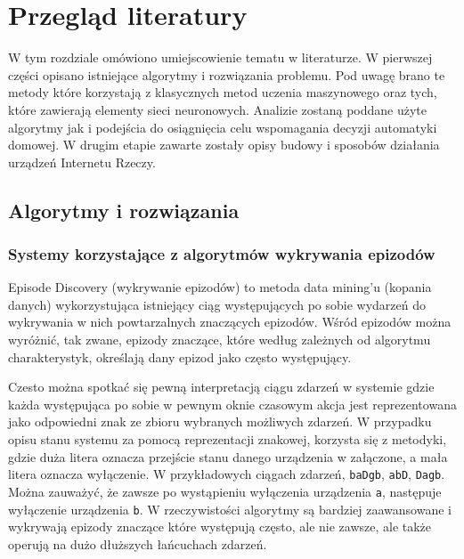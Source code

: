
\chapter{Przegląd literatury}


W tym rozdziale omówiono umiejscowienie tematu w literaturze. W pierwszej części opisano istniejące algorytmy i rozwiązania problemu. Pod uwagę brano te metody które korzystają z klasycznych metod uczenia maszynowego oraz tych, które zawierają elementy sieci neuronowych. Analizie zostaną poddane użyte algorytmy jak i podejścia do osiągnięcia celu wspomagania decyzji automatyki domowej. W drugim etapie zawarte zostały opisy budowy i sposobów działania urządzeń Internetu Rzeczy.

\section{Algorytmy i rozwiązania}
\subsection{Systemy korzystające z algorytmów wykrywania epizodów}
\label{subsec:episode_discovery}
Episode Discovery (wykrywanie epizodów) to metoda data mining'u (kopania danych) wykorzystująca istniejący ciąg występujących po sobie wydarzeń do wykrywania w nich powtarzalnych znaczących epizodów. Wśród epizodów można wyróżnić, tak zwane, epizody znaczące, które według zależnych od algorytmu charakterystyk, określają dany epizod jako często występujący.

Czesto można spotkać się pewną interpretacją ciągu zdarzeń w systemie gdzie każda występująca po sobie w pewnym oknie czasowym akcja jest reprezentowana jako odpowiedni znak ze zbioru wybranych możliwych zdarzeń. W przypadku opisu stanu systemu za pomocą reprezentacji znakowej, korzysta się z metodyki, gdzie duża litera oznacza przejście stanu danego urządzenia w załączone, a mała litera oznacza wyłączenie. W przykładowych ciągach zdarzeń, \verb|baDgb|, \verb|abD|, \verb|Dagb|. Można zauważyć, że zawsze po wystąpieniu wyłączenia urządzenia \verb|a|, następuje wyłączenie urządzenia \verb|b|. W rzeczywistości algorytmy są bardziej zaawansowane i wykrywają epizody znaczące które występują często, ale nie zawsze, ale także operują na dużo dłuższych łańcuchach zdarzeń.

